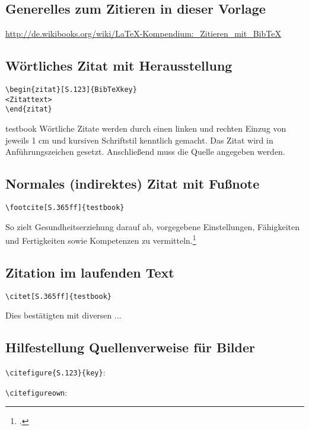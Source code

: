 \subsection{Generelles zum Zitieren in dieser Vorlage}
\url{http://de.wikibooks.org/wiki/LaTeX-Kompendium:_Zitieren_mit_BibTeX}

\subsection{Wörtliches Zitat mit Herausstellung}
	\verb|\begin{zitat}[S.123]{BibTeXkey}| \\
    \verb|<Zitattext>| \\
	\verb|\end{zitat}|\\
\begin{zitat}[S.123]{testbook} %
	Wörtliche Zitate werden durch einen linken und rechten Einzug von jeweils 1 cm
	und kursiven Schriftstil kenntlich gemacht. Das Zitat wird in Anführungszeichen gesetzt.
	Anschließend muss die Quelle angegeben werden.	
\end{zitat}

\subsection{Normales (indirektes) Zitat mit Fußnote}
	\verb|\footcite[S.365ff]{testbook}|
	
	So zielt Gesundheitserziehung darauf ab, vorgegebene Einstellungen, Fähigkeiten
	und Fertigkeiten sowie Kompetenzen zu vermitteln.\footcite[S.365ff]{testbook} \\

\subsection{Zitation im laufenden Text}
	\verb|\citet[S.365ff]{testbook}|
	
	Dies bestätigten \citet[S.365ff]{testbook} mit diversen ...
	
\subsection{Hilfestellung Quellenverweise für Bilder}

\verb|\citefigure{S.123}{key}|:~ 

\verb|\citefigureown|:~\citefigureown 

